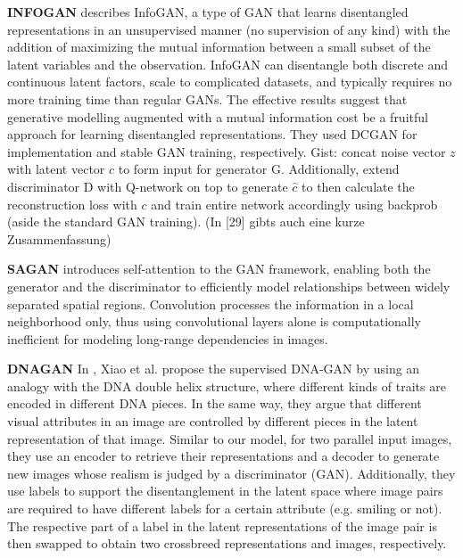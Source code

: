 \documentclass[11pt,a4paper]{article}
\begin{document}
\par\textbf{INFOGAN} \cite{1606.03657} describes InfoGAN, a type of GAN that learns disentangled representations in an unsupervised manner (no supervision of any kind) with the addition of maximizing the mutual information between a small subset of the latent variables and the observation. InfoGAN can disentangle both discrete and continuous latent factors, scale to complicated datasets, and typically requires no more training time than regular GANs.  The effective results suggest that generative modelling augmented with a mutual information cost be a fruitful approach for learning disentangled representations. They used DCGAN for implementation and stable GAN training, respectively. Gist: concat noise vector $z$ with latent vector $c$ to form input for generator G. Additionally, extend discriminator D with Q-network on top to generate $\hat{c}$ to then calculate the reconstruction loss with $c$ and train entire network accordingly using backprob (aside the standard GAN training). (In [29] gibts auch eine kurze Zusammenfassung)

\par \textbf{SAGAN} \cite{1805.08318} introduces self-attention to the GAN framework, enabling both the generator and the discriminator to efficiently model relationships between widely separated spatial regions. Convolution processes the information in a local neighborhood only, thus using convolutional layers alone is computationally inefficient for modeling long-range dependencies in images.

\par \textbf{DNAGAN} In \cite{1711.05415}, Xiao et al. propose the supervised DNA-GAN by using an analogy with the DNA double helix structure, where different kinds of traits are encoded in different DNA pieces. In the same way, they argue that different visual attributes in an image are controlled by different pieces in the latent representation of that image. Similar to our model, for two parallel input images, they use an encoder to retrieve their representations and a decoder to generate new images whose realism is judged by a discriminator (GAN). Additionally, they use labels to support the disentanglement in the latent space where image pairs are required to have different labels for a certain attribute (e.g. smiling or not). The respective part of a label in the latent representations of the image pair is then swapped to obtain two crossbreed representations and images, respectively.
\end{document}
